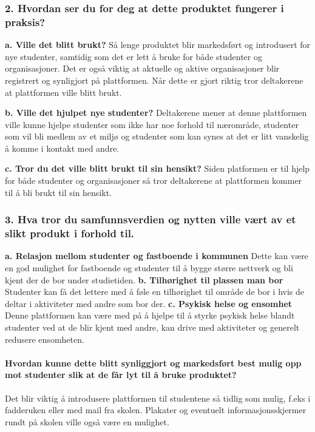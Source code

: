 \subsubsection{2. Hvordan ser du for deg at dette produktet fungerer i praksis?}

{\bf a. Ville det blitt brukt?}
Så lenge produktet blir markedsført og introdusert for nye studenter, samtidig som det er lett å bruke for både studenter og organisasjoner. Det er også viktig at aktuelle og aktive organisasjoner blir registrert og synligjort på plattformen. Når dette er gjort riktig tror deltakerene at plattformen ville blitt brukt. 

{\bf b. Ville det hjulpet nye studenter?}
Deltakerene mener at denne plattformen ville kunne hjelpe studenter som ikke har noe forhold til nærområde, studenter som vil bli medlem av et miljø og studenter som kan synes at det er litt vanskelig å komme i kontakt med andre.

{\bf c. Tror du det ville blitt brukt til sin hensikt?}
Siden platformen er til hjelp for både studenter og organisasjoner så tror deltakerene at plattformen kommer til å bli brukt til sin hensikt.

\subsubsection{3. Hva tror du samfunnsverdien og nytten ville vært av et slikt produkt i forhold til.}

{\bf a. Relasjon mellom studenter og fastboende i kommunen}
Dette kan være en god mulighet for fastboende og studenter til å bygge større nettverk og bli kjent der de bor under studietiden.
{\bf b. Tilhørighet til plassen man bor}
Studenter kan få det lettere med å føle en tilhørighet til område de bor i hvis de deltar i aktiviteter med andre som bor der.
{\bf c. Psykisk helse og ensomhet}
Denne plattformen kan være med på å hjelpe til å styrke psykisk helse blandt studenter ved at de blir kjent med andre, kan drive med aktiviteter og generelt redusere ensomheten.
\paragraph{Hvordan kunne dette blitt synliggjort og markedsført best mulig opp mot studenter slik at de får lyt til å bruke produktet?} Det blir viktig å introdusere plattformen til studentene så tidlig som mulig, f.eks i fadderuken eller med mail fra skolen. Plakater og eventuelt informasjonsskjermer rundt på skolen ville også være en mulighet.

